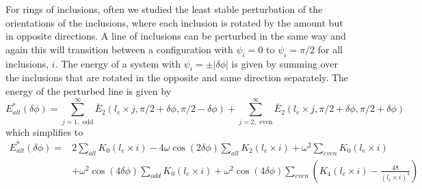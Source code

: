 For rings of inclusions, often we studied the least stable perturbation of the orientations of the inclusions, where each inclusion is rotated by the amount but in opposite directions. A line of inclusions can be perturbed in the same way and again this will transition between a configuration with $\psi_i=0$ to $\psi_i=\pi/2$ for all inclusions, $i$. The energy of a system with $\psi_i=\pm|\delta\phi|$ is given by summing over the inclusions that are rotated in the opposite and same direction separately. The energy of the perturbed line is given by  
\begin{equation}
    E^*_{alt}(\delta\phi) = \sum_{j=1,\text{ odd}}^{\infty}\bar{E}_2(l_e \times j, \pi/2+\delta\phi, \pi/2-\delta\phi) + \sum_{j=2,\text{  even}}^{\infty}\bar{E}_2(l_e \times j, \pi/2+\delta\phi, \pi/2+\delta\phi)
\end{equation}
which simplifies to
\begin{equation}
    \begin{split}
    E^*_{alt}(\delta\phi) =&2\sum_{all}K_0(l_e \times i) - 4\omega\cos(2\delta\phi)\sum_{all}K_2(l_e \times i)+ \omega^2\sum_{even}K_0(l_e \times i)\\
    &+ \omega^2\cos(4\delta\phi)\sum_{odd}K_0(l_e \times i) + \omega^2\cos(4\delta\phi)\sum_{even}\left(K_4(l_e \times i)-\frac{48}{(l_e \times i)^4}\right)
    \end{split}
\end{equation}
